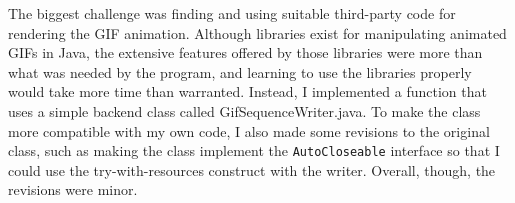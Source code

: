 \documentclass[10 pt]{scrartcl}
\begin{document}
The biggest challenge was finding and using suitable third-party code for rendering the GIF animation. Although libraries exist for manipulating animated GIFs in Java, the extensive features offered by those libraries were more than what was needed by the program, and learning to use the libraries properly would take more time than warranted. Instead, I implemented a function that uses a simple backend class called GifSequenceWriter.java. To make the class more compatible with my own code, I also made some revisions to the original class, such as making the class implement the \verb|AutoCloseable| interface so that I could use the try-with-resources construct with the writer. Overall, though, the revisions were minor.

%
\end{document}
